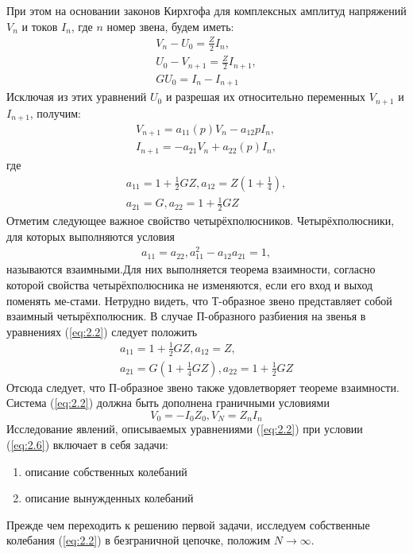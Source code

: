 При этом на основании законов Кирхгофа для комплексных амплитуд напряжений $V_n$ и токов $I_n$, где $n$ номер звена, будем иметь:
\begin{gather}
\label{eq:2.1}
V_n-U_0=\frac{Z}{2}I_n, \\
U_0-V_{n+1}=\frac{Z}{2}I_{n+1}, \\
GU_0=I_n-I_{n+1}
\end{gather}
Исключая из этих уравнений $U_0$ и разрешая их относительно переменных $V_{n+1}$ и $I_{n+1}$, получим:
\begin{gather}
\label{eq:2.2}
V_{n+1}=a_{11}(p)V_n-a_{12}{p}I_n, \\
I_{n+1}=-a_{21}V_n+a_{22}(p)I_n,
\end{gather}
где
\begin{gather}
\label{eq:2.3}
a_{11}=1+\frac{1}{2}GZ, a_{12}=Z(1+\frac{1}{4}),\\
a_{21}=G, a_{22}=1+\frac{1}{2}GZ
\end{gather}
Отметим следующее важное свойство четырёхполюсников. Четырёхполюсники, для которых выполняются условия
\begin{gather}
\label{eq:2.4}
a_{11}= a_{22},a_{11}^2-a_{12}a_{21}=1,
\end{gather}
называются взаимными.Для них выполняется теорема взаимности, согласно которой свойства четырёхполюсника не изменяются, если его вход и выход поменять ме-стами. Нетрудно видеть, что Т-образное звено представляет собой взаимный четырёхполюсник. В случае П-образного разбиения на звенья в уравнениях (\ref{eq:2.2}) следует положить 
\begin{gather}
a_{11}=1+\frac{1}{2}GZ, a_{12}=Z,\\
a_{21}=G(1+\frac{1}{4}GZ), a_{22}=1+\frac{1}{2}GZ
\end{gather}
Отсюда следует, что П-образное звено также удовлетворяет теореме взаимности. 
Система (\ref{eq:2.2}) должна быть дополнена граничными условиями
\begin{equation}
	\label{eq:2.6}
	V_0=-I_0Z_0, V_N=Z_nI_n
\end{equation}
Исследование явлений, описываемых уравнениями (\ref{eq:2.2}) при условии (\ref{eq:2.6}) включает в себя задачи:
\begin{enumerate}
	\item описание собственных колебаний
	\item описание вынужденных колебаний
\end{enumerate}
Прежде чем переходить к решению первой задачи, исследуем собственные колебания (\ref{eq:2.2}) в безграничной цепочке, положим $N\rightarrow\infty$.

